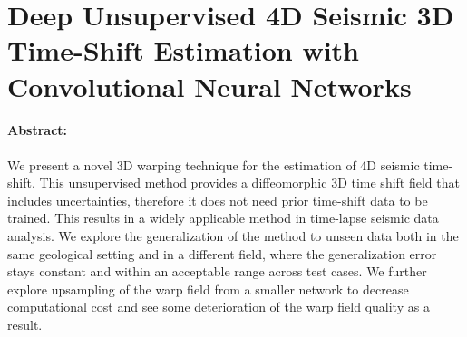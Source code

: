 \section{Deep Unsupervised 4D Seismic 3D Time-Shift Estimation with Convolutional Neural Networks}

\paragraph{Abstract:} We present a novel 3D warping technique for the estimation of 4D seismic time-shift. This unsupervised method provides a diffeomorphic 3D time shift field that includes uncertainties, therefore it does not need prior time-shift data to be trained. This results in a widely applicable method in time-lapse seismic data analysis. We explore the generalization of the method to unseen data both in the same geological setting and in a different field, where the generalization error stays constant and within an acceptable range across test cases. We further explore upsampling of the warp field from a smaller network to decrease computational cost and see some deterioration of the warp field quality as a result.

{\vfill\hfill\newline{}}


